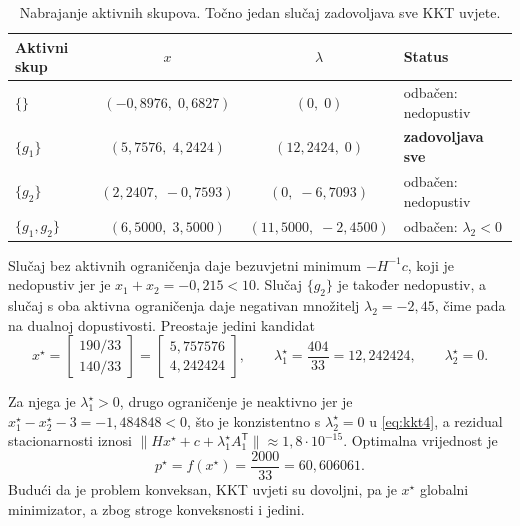 \begin{table}[htbp]
  \centering
  \caption{Nabrajanje aktivnih skupova. Točno jedan slučaj zadovoljava sve KKT uvjete.}
  \label{tab:z1cases}
  \begin{tabular}{lccl}
    \hline
    Aktivni skup & $x$ & $\lambda$ & Status \\
    \hline
    $\{\}$          & $(-0{,}8976,\; 0{,}6827)$ & $(0,\; 0)$ & odbačen: nedopustiv \\
    $\{g_1\}$       & $(5{,}7576,\; 4{,}2424)$  & $(12{,}2424,\; 0)$ & \textbf{zadovoljava sve} \\
    $\{g_2\}$       & $(2{,}2407,\; -0{,}7593)$ & $(0,\; -6{,}7093)$ & odbačen: nedopustiv \\
    $\{g_1, g_2\}$  & $(6{,}5000,\; 3{,}5000)$  & $(11{,}5000,\; -2{,}4500)$ & odbačen: $\lambda_2 < 0$ \\
    \hline
  \end{tabular}
\end{table}

Slučaj bez aktivnih ograničenja daje bezuvjetni minimum $-H^{-1}c$, koji je
nedopustiv jer je $x_1 + x_2 = -0{,}215 < 10$. Slučaj $\{g_2\}$ je također
nedopustiv, a slučaj s oba aktivna ograničenja daje negativan množitelj
$\lambda_2 = -2{,}45$, čime pada na dualnoj dopustivosti. Preostaje jedini
kandidat
\begin{equation}
  x^\star = \begin{bmatrix} 190/33 \\ 140/33 \end{bmatrix}
          = \begin{bmatrix} 5{,}757576 \\ 4{,}242424 \end{bmatrix}, \qquad
  \lambda_1^\star = \frac{404}{33} = 12{,}242424, \qquad \lambda_2^\star = 0 .
  \label{eq:z1sol}
\end{equation}

Za njega je $\lambda_1^\star > 0$, drugo ograničenje je neaktivno jer je
$x_1^\star - x_2^\star - 3 = -1{,}484848 < 0$, što je konzistentno s
$\lambda_2^\star = 0$ u \eqref{eq:kkt4}, a rezidual stacionarnosti iznosi
$\lVert Hx^\star + c + \lambda_1^\star A_1^{\mathsf T}\rVert \approx 1{,}8\cdot10^{-15}$.
Optimalna vrijednost je
\begin{equation}
  p^\star = f(x^\star) = \frac{2000}{33} = 60{,}606061 .
\end{equation}
Budući da je problem konveksan, KKT uvjeti su dovoljni, pa je $x^\star$ globalni
minimizator, a zbog stroge konveksnosti i jedini.

